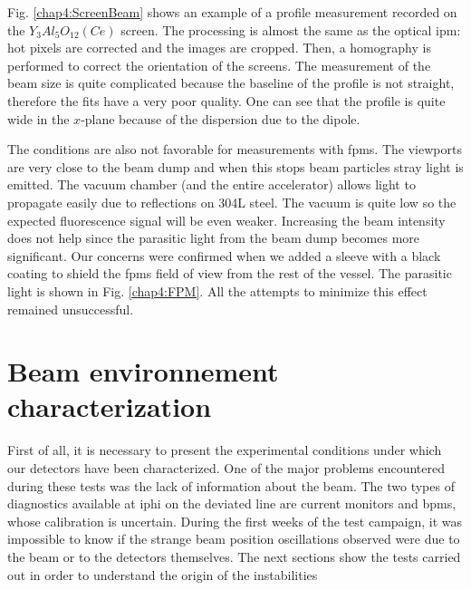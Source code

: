 \begin{refsection}
  Fig. \ref{chap4:ScreenBeam} shows an example of a profile measurement recorded on the $Y_{3}Al_{5}O_{12}(Ce)$ screen. The processing is almost the same as the optical \acrshort{ipm}: hot pixels are corrected and the images are cropped. Then, a homography \cite{szeliski2010,opencv_library} is performed to correct the orientation of the screens. The measurement of the beam size is quite complicated because the baseline of the profile is not straight, therefore the fits have a very poor quality. One can see that the profile is quite wide in the $x$-plane because of the dispersion due to the dipole.

  The conditions are also not favorable for measurements with \acrshort{fpm}s. The viewports are very close to the beam dump and when this stops beam particles stray light is emitted. The vacuum chamber (and the entire accelerator) allows light to propagate easily due to reflections on 304L steel. The vacuum is quite low so the expected fluorescence signal will be even weaker. Increasing the beam intensity does not help since the parasitic light from the beam dump becomes more significant.
  Our concerns were confirmed when we added a sleeve with a black coating to shield the \acrshort{fpm}s field of view from the rest of the vessel. The parasitic light is shown in Fig. \ref{chap4:FPM}. All the attempts to minimize this effect remained unsuccessful.

  

  \section{Beam environnement characterization}
  First of all, it is necessary to present the experimental conditions under which our detectors have been characterized. One of the major problems encountered during these tests was the lack of information about the beam. The two types of diagnostics available at \acrshort{iphi} on the deviated line are current monitors and \acrshort{bpm}s, whose calibration is uncertain. During the first weeks of the test campaign, it was impossible to know if the strange beam position oscillations observed were due to the beam or to the detectors themselves. The next sections show the tests carried out in order to understand the origin of the instabilities


\end{refsection}
